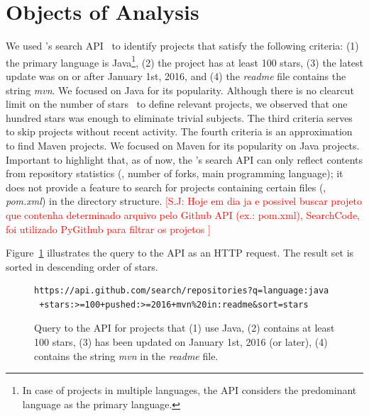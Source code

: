 \documentclass[10pt,journal,compsoc]{IEEEtran}
\begin{document}

\section{Objects of Analysis}
\label{sec:subjects}

We used \github{}'s search API~\cite{githubsearch} to identify
projects that satisfy the following criteria: (1) the primary language
is Java\footnote{In case of projects in multiple languages, the
  \github{} API considers the predominant language as the primary
  language.}, (2) the project has at least 100 stars, (3) the latest
update was on or after January 1st, 2016, and (4) the \emph{readme}
file contains the string \emph{mvn}.  We focused on Java for its
popularity.  Although there is no clearcut limit on the number of
\github{} stars~\cite{github-stars} to define relevant projects, we
observed that one hundred stars was enough to eliminate trivial subjects. The
third
criteria serves to skip projects without recent activity. The fourth
criteria is an approximation to find Maven projects. We focused on Maven for its popularity on
Java projects.  Important to highlight that, as of now, the
\github{}'s search API can only reflect contents from repository
statistics (\eg, number of forks, main programming language); it does
not provide a feature to search for projects containing certain files
(\eg{}, \emph{pom.xml}) in the directory structure. 
\textcolor{red}{[S.J: Hoje em dia ja e possivel buscar projeto que contenha determinado arquivo pelo Github API (ex.: pom.xml), SearchCode, foi utilizado PyGithub para filtrar os projetos ]}

Figure~\ref{fig:subject-query} illustrates the query to the \github{}
API as an HTTP request.   The result set is sorted
in descending order of stars.

\begin{figure}[t!]
\centering
\tiny
{}
\begin{lstlisting}
https://api.github.com/search/repositories?q=language:java
 +stars:>=100+pushed:>=2016+mvn%20in:readme&sort=stars
\end{lstlisting}
  \vspace{-3mm}
  \caption{\label{fig:subject-query} Query to the \github{} API for
  projects that (1) use Java, (2) contains at least 100
  stars, (3) has been updated on January 1st, 2016 (or later), (4) contains
  the string \emph{mvn} in the \emph{readme} file.}
  \vspace{-3mm}
\end{figure}
\end{document}
